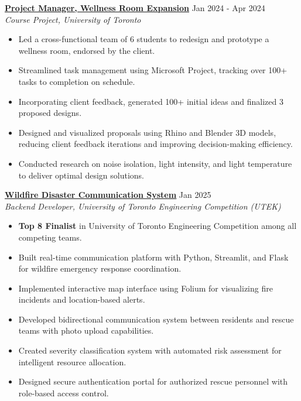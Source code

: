 \documentclass[letterpaper,10pt]{article}
\begin{document}
\vspace{0.3cm}
\noindent\href{https://github.com/Ken-2511/wellness-room-expansion}{\uline{
\textbf{Project Manager, Wellness Room Expansion}}} \hfill Jan 2024 - Apr 2024\\
\textit{Course Project, University of Toronto}
\begin{itemize}[leftmargin=0.2in]
    \item Led a cross-functional team of 6 students to redesign and prototype a wellness room, endorsed by the client.
    \item Streamlined task management using Microsoft Project, tracking over 100+ tasks to completion on schedule.
    \item Incorporating client feedback, generated 100+ initial ideas and finalized 3 proposed designs.
    \item Designed and visualized proposals using Rhino and Blender 3D models, reducing client feedback iterations and improving decision-making efficiency.
    \item Conducted research on noise isolation, light intensity, and light temperature to deliver optimal design solutions.
\end{itemize}

\vspace{0.3cm}
\noindent\href{https://github.com/Ken-2511/utek_disaster_communication_system}{\uline{
\textbf{Wildfire Disaster Communication System}}} \hfill Jan 2025\\
\textit{Backend Developer, University of Toronto Engineering Competition (UTEK)}
\begin{itemize}[leftmargin=0.2in]
    \item \textbf{Top 8 Finalist} in University of Toronto Engineering Competition among all competing teams.
    \item Built real-time communication platform with Python, Streamlit, and Flask for wildfire emergency response coordination.
    \item Implemented interactive map interface using Folium for visualizing fire incidents and location-based alerts.
    \item Developed bidirectional communication system between residents and rescue teams with photo upload capabilities.
    \item Created severity classification system with automated risk assessment for intelligent resource allocation.
    \item Designed secure authentication portal for authorized rescue personnel with role-based access control.
\end{itemize}
\end{document}
